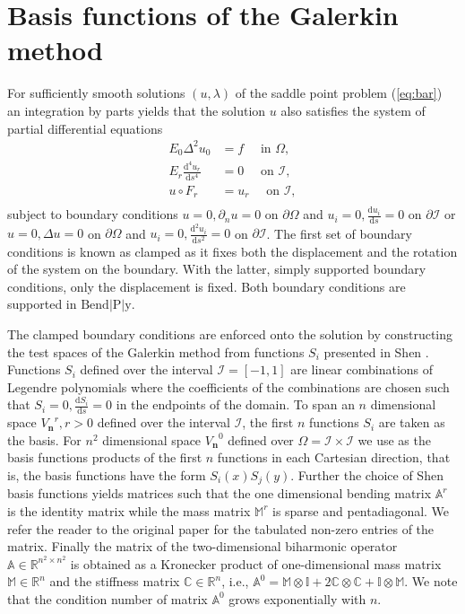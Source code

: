 \documentclass{marine_2015}
\newcommand{\Vh}{\ensuremath{V_{\mathbf{n}}}}
\newcommand{\deriv}[2]{\ensuremath{\frac{\mathrm{d}#1}{\mathrm{d}#2}}}
\newcommand{\tderiv}[2]{\ensuremath{\tfrac{\mathrm{d}#1}{\mathrm{d}#2}}}
\begin{document}
\section{Basis functions of the Galerkin method}
\label{sec:basis}
For sufficiently smooth solutions $\left(u, \lambda\right)$ of the saddle point
problem (\ref{eq:bar}) an integration by parts yields that the solution $u$ also
satisfies the system of partial differential equations
\[
  \begin{aligned}
    E_0\Delta^2u_0 &= f\quad\text{ in }\Omega,\\
    E_r\deriv{^4 u_r}{s^4} &= 0\quad\text{ on }\mathcal{I},\\
    u \circ F_r&= u_r\quad\text{ on }\mathcal{I},\\
  \end{aligned}
\]
subject to boundary conditions $u=0, \partial_nu=0$ on $\partial\Omega $ and 
$u_i=0, \tderiv{u_i}{s}=0$ on $\partial\mathcal{I}$
or $u=0, \Delta u=0$ on $\partial\Omega$ and $u_i=0, \tderiv{^2u_i}{s^2}=0$ on
$\partial\mathcal{I}$. The first set of boundary conditions is known as clamped as
it fixes both the displacement and the rotation of the system on the boundary. With
the latter, simply supported boundary conditions, only the displacement is fixed. 
Both boundary conditions are supported in $\text{Bend}\!\left|\text{P}\right|\!\text{y}$. 

The clamped boundary conditions are enforced onto the solution by constructing
the test spaces of the Galerkin method from functions $S_i$ presented in Shen
\cite{shenpaper}. Functions $S_i$ defined over the interval
$\mathcal{I}=\left[-1, 1\right]$ are linear combinations of Legendre
polynomials where the coefficients of the combinations are chosen such that
$S_i=0, \tderiv{S_i}{s}=0$ in the endpoints of the domain. To span an $n$
dimensional space $\Vh^r, r>0$ defined over the interval $\mathcal{I}$, the first 
$n$ functions $S_i$ are taken as the basis. For $n^2$ dimensional space $\Vh^0$ 
defined over $\Omega=\mathcal{I}\times\mathcal{I}$ we use as the basis functions 
products of the first $n$ functions in each Cartesian direction, that is, the basis 
functions have the form $S_i\left(x\right)S_j\left(y\right)$. Further the choice of
Shen basis functions yields matrices such that the one dimensional bending matrix
$\mathbb{A}^r$ is the identity matrix while the mass matrix $\mathbb{M}^r$ is sparse and
pentadiagonal. We refer the reader to the original paper \cite{shenpaper} for the
tabulated non-zero entries of the matrix. Finally the matrix of the two-dimensional 
biharmonic operator $\mathbb{A}\in\mathbb{R}^{n^2\times n^2}$ is obtained
as a Kronecker product of one-dimensional mass matrix $\mathbb{M}\in\mathbb{R}^n$ and 
the stiffness matrix $\mathbb{C}\in\mathbb{R}^n$, i.e., $\mathbb{A}^0 = \mathbb{M}\otimes\mathbb{I} + 
2\mathbb{C}\otimes\mathbb{C} + \mathbb{I}\otimes\mathbb{M}$. We note that the
condition number of matrix $\mathbb{A}^0$ grows exponentially with $n$.
\end{document}
